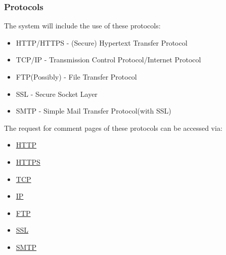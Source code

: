 \documentclass{article}
\begin{document}

		\subsubsection{Protocols}
		The system will include the use of these protocols:
		\begin{itemize}
			\item HTTP/HTTPS - (Secure) Hypertext Transfer Protocol
			\item TCP/IP - Transmission Control Protocol/Internet Protocol
			\item FTP(Possibly) - File Transfer Protocol
			\item SSL - Secure Socket Layer 
			\item SMTP - Simple Mail Transfer Protocol(with  SSL)
		\end{itemize}
		The request for comment pages of these protocols can be accessed via:
		\begin{itemize}
			\item\href{https://tools.ietf.org/html/rfc2616}{HTTP}
			\item\href{https://tools.ietf.org/html/rfc2660}{HTTPS}
			\item\href{https://www.ietf.org/rfc/rfc793.txt}{TCP}
			\item\href{http://www.ietf.org/rfc/rfc0791.txt}{IP}
			\item\href{https://www.ietf.org/rfc/rfc959.txt}{FTP}
			\item\href{https://tools.ietf.org/html/rfc6101}{SSL}
			\item\href{https://tools.ietf.org/html/rfc821}{SMTP}
		\end{itemize}
		
		
\end{document}
